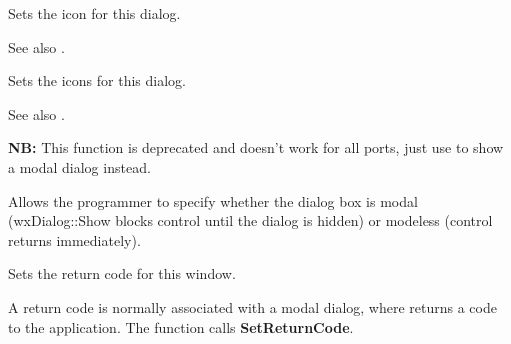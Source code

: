 \label{wxdialogseticon}


Sets the icon for this dialog.



See also .


\label{wxdialogseticons}


Sets the icons for this dialog.



See also .


\label{wxdialogsetmodal}


{\bf NB:} This function is deprecated and doesn't work for all ports, just use
 to show a modal dialog instead.

Allows the programmer to specify whether the dialog box is modal (wxDialog::Show blocks control
until the dialog is hidden) or modeless (control returns immediately).




\label{wxdialogsetreturncode}


Sets the return code for this window.




A return code is normally associated with a modal dialog, where  returns
a code to the application. The function  calls {\bf SetReturnCode}.

